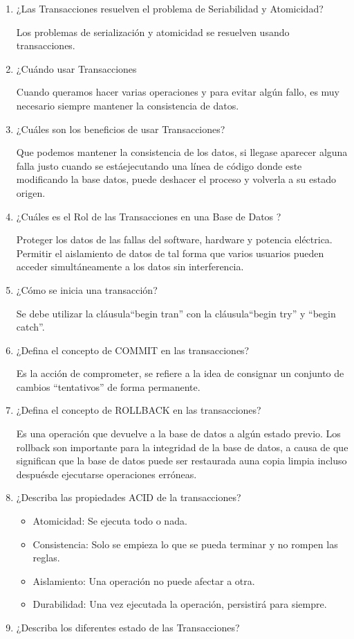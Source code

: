 \begin{enumerate}
\item ¿Las Transacciones resuelven el problema de Seriabilidad y Atomicidad?

Los problemas de serialización y atomicidad se resuelven usando transacciones.

\item ¿Cuándo usar Transacciones

Cuando queramos hacer varias operaciones y para evitar algún fallo, es muy necesario siempre mantener la consistencia de datos. 

\item ¿Cuáles son los beneficios de usar Transacciones?

Que podemos mantener la consistencia de los datos, si llegase aparecer alguna falla justo cuando se estáejecutando una línea de código donde este modificando la base datos, puede deshacer el proceso y volverla a su estado origen. 

\item ¿Cuáles es el Rol de las Transacciones en una Base de Datos ?

Proteger los datos de las fallas del software, hardware y potencia eléctrica. Permitir el aislamiento de datos de tal forma que varios usuarios pueden acceder simultáneamente a los datos sin interferencia. 

\item ¿Cómo se inicia una transacción?

Se debe utilizar la cláusula“begin tran” con la cláusula“begin try” y “begin catch”. 

\item ¿Defina el concepto de COMMIT en las transacciones?

Es la acción de comprometer, se refiere a la idea de consignar un conjunto de cambios “tentativos” de forma permanente. 

\item ¿Defina el concepto de ROLLBACK en las transacciones?

Es una operación que devuelve a la base de datos a algún estado previo. Los rollback son importante para la integridad de la base de datos, a causa de que significan que la base de datos puede ser restaurada auna copia limpia incluso despuésde ejecutarse operaciones erróneas.

\item ¿Describa las propiedades ACID de la transacciones?

\begin{itemize}
\item Atomicidad: Se ejecuta todo o nada. 
\item Consistencia: Solo se empieza lo que se pueda terminar y no rompen las reglas. 
\item Aislamiento: Una operación no puede afectar a otra.
\item Durabilidad: Una vez ejecutada la operación, persistirá para siempre. 
\end{itemize}
\item ¿Describa los diferentes estado de las Transacciones?


\end{enumerate}
